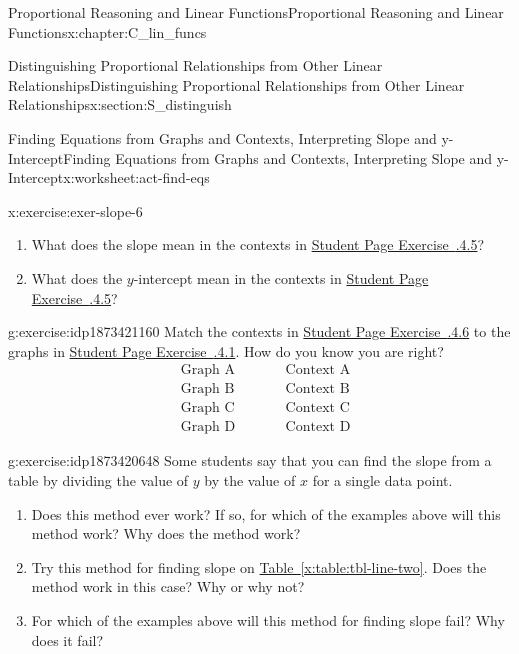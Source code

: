 \documentclass[oneside,10pt,]{book}
\newcommand{\xreffont}{\relax}
\numberwithin{equation}{chapter}
\newcommand{\amp}{&}
\begin{document}
\begin{chapterptx}{Proportional Reasoning and Linear Functions}{}{Proportional Reasoning and Linear Functions}{}{}{x:chapter:C_lin_funcs}
\begin{sectionptx}{Distinguishing Proportional Relationships from Other Linear Relationships}{}{Distinguishing Proportional Relationships from Other Linear Relationships}{}{}{x:section:S_distinguish}
\begin{worksheet-subsection}{Finding Equations from Graphs and Contexts, Interpreting Slope and y-Intercept}{}{Finding Equations from Graphs and Contexts, Interpreting Slope and y-Intercept}{}{}{x:worksheet:act-find-eqs}
\begin{divisionexercise}{6}{}{}{x:exercise:exer-slope-6}
\begin{enumerate}[font=\bfseries,label=(\alph*),ref=\alph*]
\item{}What does the slope mean in the contexts in \hyperlink{x:exercise:exer-slope-contexts}{Student Page Exercise~{\xreffont 2.6.4.5}}?%
\item{}What does the \(y\)-intercept mean in the contexts in \hyperlink{x:exercise:exer-slope-contexts}{Student Page Exercise~{\xreffont 2.6.4.5}}?%
\end{enumerate}
\end{divisionexercise}%
\begin{divisionexercise}{7}{}{}{g:exercise:idp1873421160}%
Match the contexts in \hyperlink{x:exercise:exer-slope-6}{Student Page Exercise~{\xreffont 2.6.4.6}} to the graphs in \hyperlink{x:exercise:exer-eq-1}{Student Page Exercise~{\xreffont 2.6.4.1}}. How do you know you are right?%
\begin{align*}
\amp \text{Graph A} \amp \qquad \amp \text{Context A}\\
\amp \text{Graph B} \amp \qquad \amp \text{Context B}\\
\amp \text{Graph C} \amp \qquad \amp \text{Context C}\\
\amp \text{Graph D} \amp \qquad \amp \text{Context D}
\end{align*}
%
\end{divisionexercise}%
\begin{divisionexercise}{8}{}{}{g:exercise:idp1873420648}%
Some students say that you can find the slope from a table by dividing the value of \(y\) by the value of \(x\) for a single data point.%
\begin{enumerate}[font=\bfseries,label=(\alph*),ref=\alph*]
\item{}Does this method ever work? If so, for which of the examples above will this method work? Why does the method work?%
\item{}Try this method for finding slope on \hyperref[x:table:tbl-line-two]{Table~{\xreffont\ref{x:table:tbl-line-two}}}. Does the method work in this case? Why or why not?%
\item{}For which of the examples above will this method for finding slope fail? Why does it fail?%
\end{enumerate}
\end{divisionexercise}%
\end{worksheet-subsection}
\restoregeometry
%
%
\typeout{************************************************}
\typeout{************************************************}
%

\end{sectionptx}
\end{chapterptx}
\end{document}
